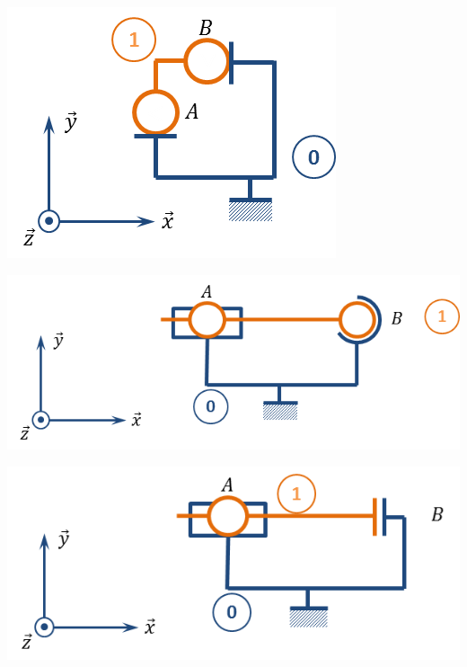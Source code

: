 \documentclass[10pt]{article}
\begin{document}
\begin{minipage}[c]{.32\linewidth}
\begin{center}
\includegraphics[width=.95\textwidth]{images/fig_04}
\end{center}
\end{minipage}\hfill
\begin{minipage}[c]{.32\linewidth}
\begin{center}
\includegraphics[width=.95\textwidth]{images/fig_05}
\end{center}
\end{minipage}\hfill
\begin{minipage}[c]{.32\linewidth}
\begin{center}
\includegraphics[width=.95\textwidth]{images/fig_06}
\end{center}
\end{minipage}
\end{document}
